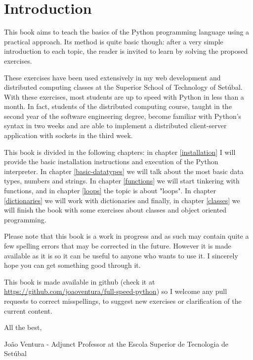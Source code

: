 \chapter{Introduction}\label{introduction}

This book aims to teach the basics of the Python programming language using a practical approach. Its method is quite basic though: after a very simple introduction to each topic, the reader is invited to learn by solving the proposed exercises.

These exercises have been used extensively in my web development and distributed computing classes at the Superior School of Technology of Setúbal. With these exercises, most students are up to speed with Python in less than a month. In fact, students of the distributed computing course, taught in the second year of the software engineering degree, become familiar with Python's syntax in two weeks and are able to implement a distributed client-server application with sockets in the third week.

This book is divided in the following chapters: in chapter \ref{installation} I will provide the basic installation instructions and execution of the Python interpreter. In chapter \ref{basic-datatypes} we will talk about the most basic data types, numbers and strings. In chapter \ref{functions} we will start tinkering with functions, and in chapter \ref{loops} the topic is about "loops". In chapter \ref{dictionaries} we will work with dictionaries and finally, in chapter \ref{classes} we will finish the book with some exercises about classes and object oriented programming.

Please note that this book is a work in progress and as such may contain quite a few spelling errors that may be corrected in the future. However it is made available as it is so it can be useful to anyone who wants to use it. I sincerely hope you can get something good through it.

This book is made available in github (check it at \url{https://github.com/joaoventura/full-speed-python}) so I welcome any pull requests to correct misspellings, to suggest new exercises or clarification of the current content.

All the best,

João Ventura - Adjunct Professor at the Escola Superior de Tecnologia de Setúbal
